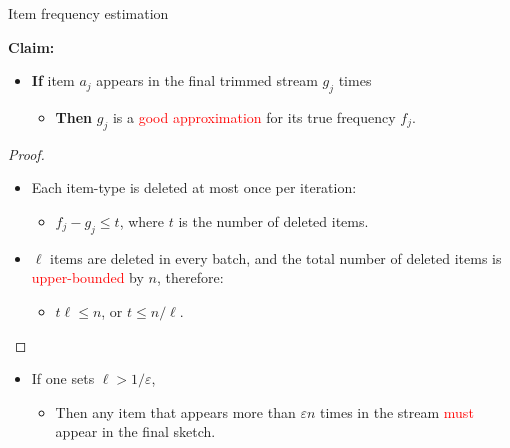 \documentclass[first=dgreen,second=purple,logo=redque]{aaltoslides}
\begin{document}
\begin{frame}[allowframebreaks=1]{Item frequency estimation}


\textbf{Claim:}

\begin{itemize}
\item \textbf{If} item $a_{j}$ appears in the \textcolor{dgreen}{final} trimmed
stream $g_{j}$ times
\begin{itemize}
  \item \textbf{Then} $g_{j}$ is a \textcolor{red}{good approximation} for its
  true frequency $f_{j}$.%
\end{itemize}         
\end{itemize}

\begin{proof}
\begin{itemize}
   \item Each item-type is deleted \textcolor{dgreen}{at most} once per iteration:
   \begin{itemize} \item $f_{j} - g_{j} \leq t$, where $t$ is the
   number of deleted items.\end{itemize}



   \item $\ell$ items are deleted in every batch, and the total number of
   deleted items is \textcolor{red}{upper-bounded} by $n$, therefore:
   \begin{itemize} \item $t\ell \leq n$, or $t \leq n/\ell$\cite{Misra82}.\end{itemize} 
\end{itemize}
\end{proof}
\begin{itemize}
  \item If one sets $\ell > 1/\varepsilon$,
  \begin{itemize} \item Then any item that appears \textcolor{dgreen}{more than}
  $\varepsilon n$ times in the stream \textcolor{red}{must} appear in
  the final sketch.\end{itemize}
\end{itemize}
  
\end{frame}
\end{document}
